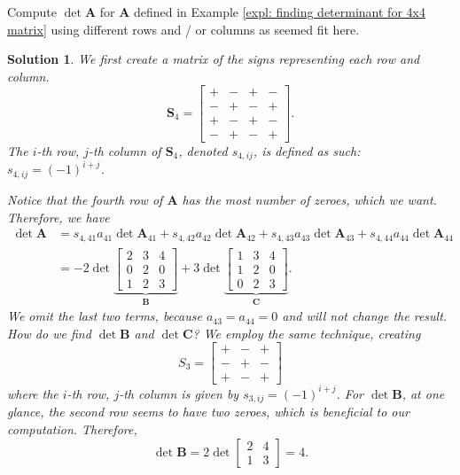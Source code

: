 \documentclass[]{book}
\newcommand{\mat}[1]{\ensuremath{\mathbf{#1}}}
\newtheorem*{solution}{Solution}
\begin{document}
\begin{example}
    \label{expl: finding determinant for 4x4 matrix along other rows and columns}
    Compute $\det\mat{A}$ for $\mat{A}$ defined in Example \ref{expl: finding determinant for 4x4 matrix} using different rows and / or columns as seemed fit here.
\begin{solution}
    We first create a matrix of the signs representing each row and column.
    \[\mat{S}_4 = \begin{bmatrix}+&-&+&- \\ -&+&-&+ \\+&-&+&- \\ -&+&-&+\end{bmatrix}.\]
    The $i$-th row, $j$-th column of $\mat{S}_4$, denoted $s_{4,ij}$, is defined as such: $s_{4,ij} = (-1)^{i + j}$. 
    
    Notice that the fourth row of $\mat{A}$ has the most number of zeroes, which we want. Therefore, we have
    \begin{align*}
        \det\mat{A} &= s_{4,41}a_{41}\det\mat{A}_{41} + s_{4,42}a_{42}\det\mat{A}_{42} + s_{4,43}a_{43}\det\mat{A}_{43} + s_{4,44}a_{44}\det\mat{A}_{44} \\
        &= -2 \det\underbrace{\begin{bmatrix}2 & 3 & 4 \\ 0 & 2 & 0 \\ 1 & 2 & 3\end{bmatrix}}_{\mat{B}}  + 3 \det\underbrace{\begin{bmatrix}1 & 3 & 4 \\ 1 & 2 & 0 \\ 0 & 2 & 3 \end{bmatrix}}_{\mat{C}}.
    \end{align*}
    We omit the last two terms, because $a_{43} = a_{44} = 0$ and will not change the result. How do we find $\det\mat{B}$ and $\det\mat{C}$? We employ the same technique, creating
    \[S_3 = \begin{bmatrix}+ & - & + \\ - & + & - \\ + & - & +\end{bmatrix}\] where the $i$-th row, $j$-th column is given by $s_{3, ij} = (-1)^{i + j}$. For $\det\mat{B}$, at one glance, the second row seems to have two zeroes, which is beneficial to our computation. Therefore,
    \[\det\mat{B} = 2\det\begin{bmatrix}2 & 4 \\ 1 & 3\end{bmatrix} = 4.\]
    

\end{solution}
\end{example}
\end{document}
